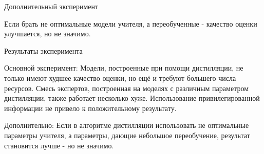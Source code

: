 \documentclass{beamer}
\begin{document}
\begin{frame}{Дополнительный эксперимент}

Если брать не оптимальные модели учителя, а переобученные - качество оценки улучшается, но не значимо.


\begin{figure}[!htb]
\end{figure}


\end{frame}

\begin{frame}{Результаты эксперимента}
\begin{block}{Основной эксперимент:}
Модели, построенные при помощи дистилляции, не только имеют худшее качество оценки, но ещё и  требуют большего числа ресурсов. Смесь экспертов, построенная на моделях с различным параметром дистилляции, также работает несколько хуже. 
Использование привилегированной информации не привело к положительному результату.
\end{block}

\begin{block}{Дополнительно:}
 Если в алгоритме дистилляции использовать не оптимальные параметры учителя, а параметры, дающие небольшое переобучение, результат становится лучше - но не значимо.
\end{block}

\end{frame}
\end{document}
